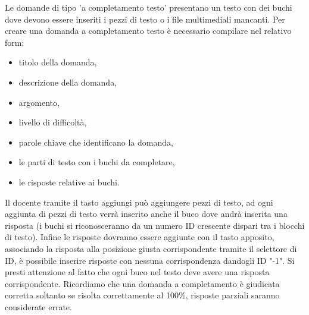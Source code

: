 \documentclass[a4paper, titlepage]{article}
\begin{document}
	 Le domande di tipo 'a completamento testo' presentano un testo con dei buchi dove devono essere inseriti i pezzi di testo o i file multimediali mancanti.
	 Per creare una domanda a completamento testo è necessario compilare nel relativo form:
	 \begin{itemize}
	 	\item titolo della domanda,
	 	\item descrizione della domanda,
	 	\item argomento,
	 	\item livello di difficoltà,
	 	\item parole chiave che identificano la domanda,
	 	\item le parti di testo con i buchi da completare,
	 	\item le risposte relative ai buchi.
	 \end{itemize}
	 Il docente tramite il tasto aggiungi può aggiungere pezzi di testo, ad ogni aggiunta di pezzi di testo verrà inserito anche il buco dove andrà inserita una risposta (i buchi si riconosceranno da un numero ID crescente dispari tra i blocchi di testo). Infine le risposte dovranno essere aggiunte con il tasto apposito, associando la risposta alla posizione giusta corrispondente tramite il selettore di ID, è possibile inserire risposte con nessuna corrispondenza dandogli ID "-1". Si presti attenzione al fatto che ogni buco nel testo deve avere una risposta corrispondente. Ricordiamo che una domanda a completamento è giudicata corretta soltanto se risolta correttamente al 100\%, risposte parziali saranno considerate errate.
	 
	 \newpage
\end{document}
